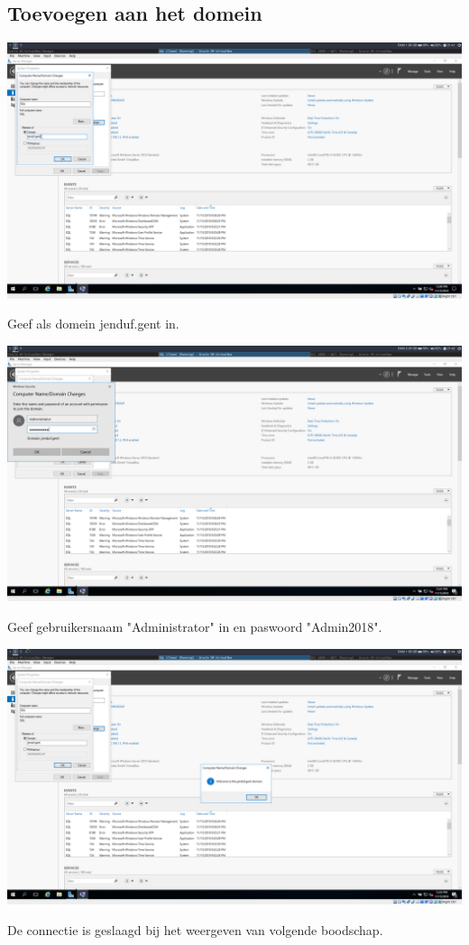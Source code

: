 \documentclass[a4paper]{article}
\begin{document}
\subsection{Toevoegen aan het domein}
\begin{center}
	\includegraphics[width=15cm]{Pictures/SQL/1542314488.png}
	
	Geef als domein jenduf.gent in.
\end{center}
\begin{center}
	\includegraphics[width=15cm]{Pictures/SQL/1542314556.png}
	
	Geef gebruikersnaam "Administrator" in en paswoord "Admin2018".
\end{center}
\begin{center}
	\includegraphics[width=15cm]{Pictures/SQL/1542314682.png}
	
	De connectie is geslaagd bij het weergeven van volgende boodschap.
\end{center}
\end{document}

